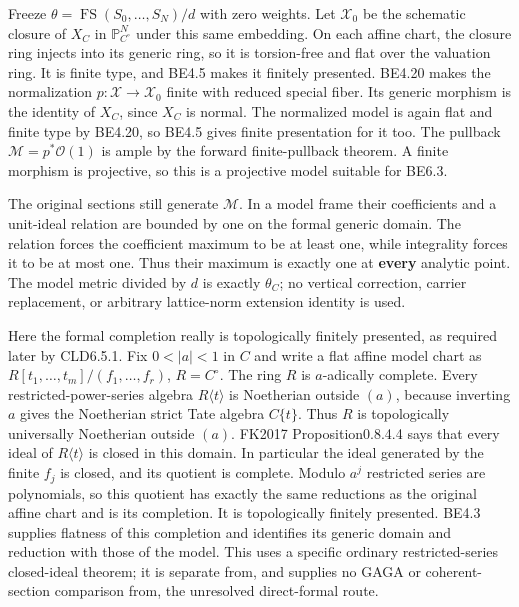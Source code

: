 \documentclass[
  11pt,
]{article}
\begin{document}
Freeze \(\theta=\operatorname{FS}(S_0,\ldots,S_N)/d\) with zero weights.
Let \(\mathcal X_0\) be the schematic closure of \(X_C\) in
\(\mathbb P^N_{C^\circ}\) under this same embedding. On each affine
chart, the closure ring injects into its generic ring, so it is
torsion-free and flat over the valuation ring. It is finite type, and
BE4.5 makes it finitely presented. BE4.20 makes the normalization
\(p:\mathcal X\to\mathcal X_0\) finite with reduced special fiber. Its
generic morphism is the identity of \(X_C\), since \(X_C\) is normal.
The normalized model is again flat and finite type by BE4.20, so BE4.5
gives finite presentation for it too. The pullback
\(\mathcal M=p^*\mathcal O(1)\) is ample by the forward finite-pullback
theorem. A finite morphism is projective, so this is a projective model
suitable for BE6.3.

The original sections still generate \(\mathcal M\). In a model frame
their coefficients and a unit-ideal relation are bounded by one on the
formal generic domain. The relation forces the coefficient maximum to be
at least one, while integrality forces it to be at most one. Thus their
maximum is exactly one at \textbf{every} analytic point. The model
metric divided by \(d\) is exactly \(\theta_C\); no vertical correction,
carrier replacement, or arbitrary lattice-norm extension identity is
used.

Here the formal completion really is topologically finitely presented,
as required later by CLD6.5.1. Fix \(0<|a|<1\) in \(C\) and write a flat
affine model chart as \(R[t_1,\ldots,t_m]/(f_1,\ldots,f_r)\),
\(R=C^\circ\). The ring \(R\) is \(a\)-adically complete. Every
restricted-power-series algebra \(R\langle t\rangle\) is Noetherian
outside \((a)\), because inverting \(a\) gives the Noetherian strict
Tate algebra \(C\{t\}\). Thus \(R\) is topologically universally
Noetherian outside \((a)\). FK2017 Proposition0.8.4.4 says that every
ideal of \(R\langle t\rangle\) is closed in this domain. In particular
the ideal generated by the finite \(f_j\) is closed, and its quotient is
complete. Modulo \(a^j\) restricted series are polynomials, so this
quotient has exactly the same reductions as the original affine chart
and is its completion. It is topologically finitely presented. BE4.3
supplies flatness of this completion and identifies its generic domain
and reduction with those of the model. This uses a specific ordinary
restricted-series closed-ideal theorem; it is separate from, and
supplies no GAGA or coherent-section comparison from, the unresolved
direct-formal route.
\end{document}
